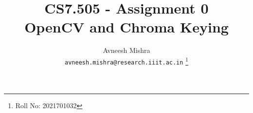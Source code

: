 

\title{CS7.505 - Assignment 0 \\
    \Large OpenCV and Chroma Keying}

\author{
    Avneesh Mishra \\
    \texttt{avneesh.mishra@research.iiit.ac.in}
    \thanks{Roll No: 2021701032}
}


    \maketitle
    \tableofcontents
    \pagebreak
    
    \pagebreak
    

